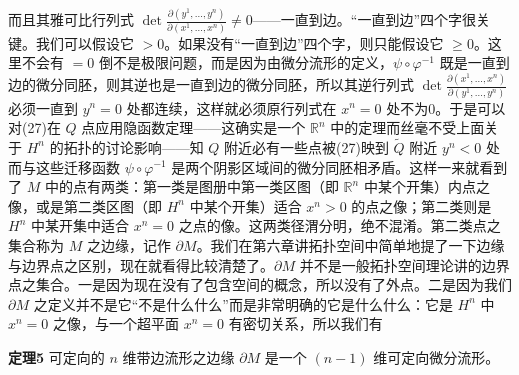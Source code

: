 而且其雅可比行列式 $\det\frac{\partial(y^1,\ldots,y^n)}{\partial(x^1,\ldots,x^n)}\ne0$——一直到边。“一直到边”四个字很关键。我们可以假设它 $>0$。如果没有“一直到边”四个字，则只能假设它 $\ge0$。这里不会有 $=0$ 倒不是极限问题，而是因为由微分流形的定义，$\psi\circ\varphi^{-1}$ 既是一直到边的微分同胚，则其逆也是一直到边的微分同胚，所以其逆行列式 $\det\frac{\partial(x^1,\ldots,x^n)}{\partial(y^1,\ldots,y^n)}$ 必须一直到 $y^n=0$ 处都连续，这样就必须原行列式在 $x^n=0$ 处不为0。于是可以对(27)在 $Q$ 点应用隐函数定理——这确实是一个 $\mathbb R^n$ 中的定理而丝毫不受上面关于 $H^n$ 的拓扑的讨论影响——知 $Q$ 附近必有一些点被(27)映到 $\widetilde Q$ 附近 $y^n<0$ 处而与这些迁移函数 $\psi\circ\varphi^{-1}$ 是两个阴影区域间的微分同胚相矛盾。这样一来就看到了 $M$ 中的点有两类：第一类是图册中第一类区图（即 $\mathbb R^n$ 中某个开集）内点之像，或是第二类区图（即 $H^n$ 中某个开集）适合 $x^n>0$ 的点之像；第二类则是 $H^n$ 中某开集中适合 $x^n=0$ 之点的像。这两类径渭分明，绝不混淆。第二类点之集合称为 $M$ 之边缘，记作 $\partial M$。我们在第六章讲拓扑空间中简单地提了一下边缘与边界点之区别，现在就看得比较清楚了。$\partial M$ 并不是一般拓扑空间理论讲的边界点之集合。一是因为现在没有了包含空间的概念，所以没有了外点。二是因为我们 $\partial M$ 之定义并不是它“不是什么什么”而是非常明确的它是什么什么：它是 $H^n$ 中 $x^n=0$ 之像，与一个超平面 $x^n=0$ 有密切关系，所以我们有

\noindent\textbf{定理5}\quad
可定向的 $n$ 维带边流形之边缘 $\partial M$ 是一个 $(n-1)$ 维可定向微分流形。

